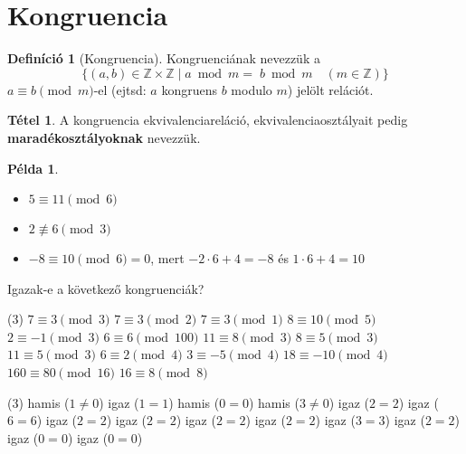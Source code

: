 \documentclass[a4paper,12pt]{article}
\theoremstyle{definition}
\newtheorem*{definition*}{Definíció}
\newtheorem*{theorem*}{Tétel}
\newtheorem*{example}{Példa}
\begin{document}
\section{Kongruencia}
\begin{definition*}[Kongruencia]
	Kongruenciának nevezzük a $$ \{(a,b) \in \mathbb{Z} \times \mathbb{Z} \mid a \bmod m =\; b \bmod m \quad (m \in \mathbb{Z})\} $$ $ a \equiv b \pmod m$-el (ejtsd: $a$ kongruens $b$ modulo $m$) jelölt relációt.
\end{definition*}
\begin{theorem*}
	A kongruencia ekvivalenciareláció, ekvivalenciaosztályait pedig \textbf{maradékosztályoknak} nevezzük.
\end{theorem*}

\begin{example} $ $ \\[-20pt]
	\begin{itemize}
		\item $ 5 \equiv 11 \pmod 6 $
		\item $ 2 \not \equiv 6 \pmod 3 $
		\item $ -8 \equiv 10 \pmod 6 = 0 $, mert $ -2 \cdot 6+4 = -8$ és $ 1 \cdot 6 + 4 = 10$
	\end{itemize}
\end{example}

\begin{question}
	Igazak-e a következő kongruenciák?
	\begin{tasks}(3)
		\task $ 7 \equiv 3 \pmod 3 $
		\task $ 7 \equiv 3 \pmod 2 $
		\task $ 7 \equiv 3 \pmod 1 $
		\task $ 8 \equiv 10 \pmod 5 $
		\task $ 2 \equiv -1 \pmod 3 $
		\task $ 6 \equiv 6 \pmod{100} $
		\task $ 11 \equiv 8 \pmod 3 $
		\task $ 8 \equiv 5 \pmod 3 $
		\task $ 11 \equiv 5 \pmod 3 $
		\task $ 6 \equiv 2 \pmod 4 $
		\task $ 3 \equiv -5 \pmod 4 $
		\task $ 18 \equiv -10 \pmod 4 $
		\task $ 160 \equiv 80 \pmod{16} $
		\task $ 16 \equiv 8 \pmod 8 $
	\end{tasks}
\end{question}

\begin{solution}
	\begin{tasks}(3)
		\task hamis ($ 1 \ne 0 $)
		\task igaz ($ 1 = 1 $)
		\task hamis ($ 0 = 0 $)
		\task hamis ($ 3 \ne 0 $)
		\task igaz ($ 2 = 2 $)
		\task igaz ($ 6 = 6 $)
		\task igaz ($ 2 = 2 $)
		\task igaz ($ 2 = 2 $)
		\task igaz ($ 2 = 2 $)
		\task igaz ($ 2 = 2 $)
		\task igaz ($ 3 = 3 $)
		\task igaz ($ 2 = 2 $)
		\task igaz ($ 0 = 0 $)
		\task igaz ($ 0 = 0 $)
	\end{tasks}
\end{solution}
\end{document}
